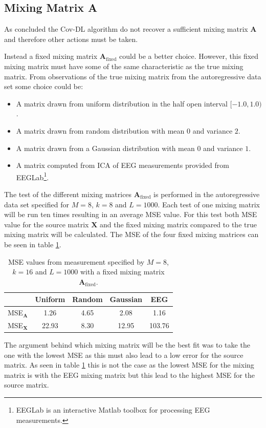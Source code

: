 \subsection{Mixing Matrix A}
As concluded the Cov-DL algorithm do not recover a sufficient mixing matrix $\mathbf{A}$ and therefore other actions must be taken. 

Instead a fixed mixing matrix $\mathbf{A}_{\text{fixed}}$ could be a better choice. However, this fixed mixing matrix must have some of the same characteristic as the true mixing matrix. 
From observations of the true mixing matrix from the autoregressive data set some choice could be:
\begin{itemize}
\item A matrix drawn from uniform distribution in the half open interval $[-1.0, 1.0)$.
\item A matrix drawn from random distribution with mean $0$ and variance $2$.
\item A matrix drawn from a Gaussian distribution with mean $0$ and variance $1$.
\item A matrix computed from ICA of EEG measurements provided from EEGLab\footnote{EEGLab is an interactive Matlab toolbox for processing EEG measurements.}.
\end{itemize}
The test of the different mixing matrices $\mathbf{A}_{\text{fixed}}$ is performed in the autoregressive data set specified for $M = 8$, $k = 8$ and $L = 1000$. Each test of one mixing matrix will be run ten times resulting in an average MSE value. For this test both MSE value for the source matrix $\mathbf{X}$ and the fixed mixing matrix compared to the true mixing matrix will be calculated. 
The MSE of the four fixed mixing matrices can be seen in table \ref{tab:fixed}.
\begin{table}[H]
\centering
\begin{tabular}{|c|c|c|c|c|}
\hline
 & Uniform & Random & Gaussian & EEG \\
\hline
MSE$_\mathbf{A}$ & 1.26 & 4.65 & 2.08 & 1.16 \\
\hline
MSE$_\mathbf{X}$ & 22.93 & 8.30 & 12.95 & 103.76 \\
\hline
\end{tabular}
\caption{MSE values from measurement specified by $M=8$, $k=16$ and $L=1000$ with a fixed mixing matrix $\mathbf{A}_{\text{fixed}}$.}
\label{tab:fixed}
\end{table}
\noindent
The argument behind which mixing matrix will be the best fit was to take the one with the lowest MSE as this must also lead to a low error for the source matrix. As seen in table \ref{tab:fixed} this is not the case as the lowest MSE for the mixing matrix is with the EEG mixing matrix but this lead to the highest MSE for the source matrix. 
